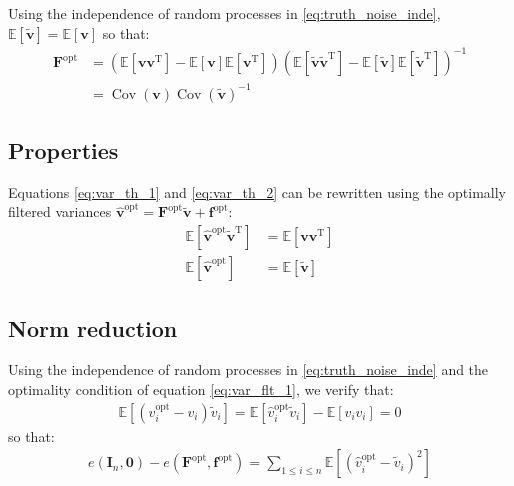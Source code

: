 \documentclass[12pt]{scrartcl}
\DeclareMathOperator{\Cov}{Cov}
\begin{document}
Using the independence of random processes in \eqref{eq:truth_noise_inde}, $\mathbb{E}\left[\widetilde{\mathbf{v}}\right] = \mathbb{E}\left[\mathbf{v}\right]$ so that:
\begin{align}
\label{eq:opt_var_filter}
\mathbf{F}^\mathrm{opt} & = \left(\mathbb{E}\left[\mathbf{v} \mathbf{v}^\mathrm{T}\right] - \mathbb{E}\left[\mathbf{v}\right] \mathbb{E}\left[\mathbf{v}^\mathrm{T}\right]\right)\left(\mathbb{E}\left[\widetilde{\mathbf{v}} \widetilde{\mathbf{v}}^\mathrm{T}\right] - \mathbb{E}\left[\widetilde{\mathbf{v}}\right] \mathbb{E}\left[\widetilde{\mathbf{v}}^\mathrm{T}\right]\right)^{-1} \nonumber \\
& = \Cov\left(\mathbf{v}\right) \Cov\left(\widetilde{\mathbf{v}}\right)^{-1}
\end{align}

\subsection{Properties}
Equations \eqref{eq:var_th_1} and \eqref{eq:var_th_2} can be rewritten using the optimally filtered variances $\widehat{\mathbf{v}}^\mathrm{opt} = \mathbf{F}^\mathrm{opt} \widetilde{\mathbf{v}} + \mathbf{f}^\mathrm{opt}$:
\begin{subequations}
\begin{align}
\label{eq:var_flt_1}
\mathbb{E}\left[\widehat{\mathbf{v}}^\mathrm{opt} \widetilde{\mathbf{v}}^\mathrm{T}\right] & = \mathbb{E}\left[\mathbf{v} \mathbf{v}^\mathrm{T}\right] \\
\label{eq:var_flt_2}
\mathbb{E}\left[\widehat{\mathbf{v}}^\mathrm{opt} \right] & = \mathbb{E}\left[\widetilde{\mathbf{v}}\right]
\end{align}
\end{subequations}

\subsection{Norm reduction}
Using the independence of random processes in \eqref{eq:truth_noise_inde} and the optimality condition of equation \eqref{eq:var_flt_1}, we verify that:
\begin{align}
\mathbb{E}\left[\left(\widehat{v}_i^\mathrm{opt} - v_i\right) \widetilde{v}_i \right] = \mathbb{E}\left[\widehat{v}_i^\mathrm{opt} \widetilde{v}_i\right] - \mathbb{E} \left[v_i v_i \right] = 0
\end{align}
so that:
\begin{align}
e\left(\mathbf{I}_n,\boldsymbol{0}\right) - e\left(\mathbf{F}^\mathrm{opt},\mathbf{f}^\mathrm{opt}\right) = \sum_{1 \le i \le n} \mathbb{E}\left[ \left(\widehat{v}_i^\mathrm{opt} - \widetilde{v}_i\right)^2\right]
\end{align}
\end{document}
